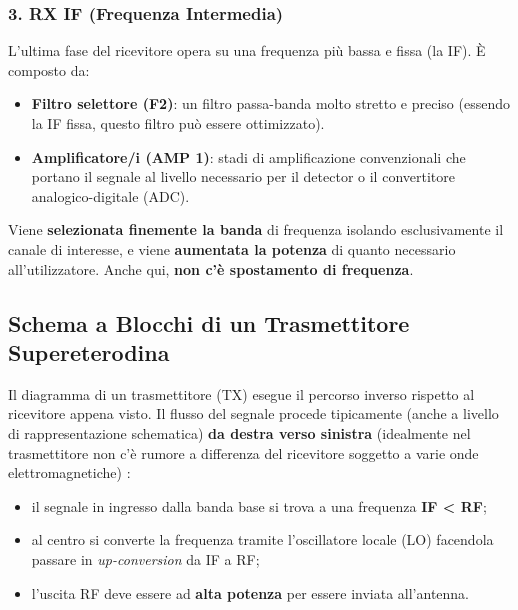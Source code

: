 \documentclass[openany,a4paper,12pt]{book}
\begin{document}
\subsubsection*{3. RX IF (Frequenza Intermedia)}
L'ultima fase del ricevitore opera su una frequenza più bassa e fissa (la IF). È composto da:
\begin{itemize}[label=\textcolor{PoliBlue}{\textbullet}]
    \item \textbf{Filtro selettore (F2)}: un filtro passa-banda molto stretto e preciso (essendo la IF fissa, questo filtro può essere ottimizzato).
    \item \textbf{Amplificatore/i (AMP 1)}: stadi di amplificazione convenzionali che portano il segnale al livello necessario per il detector o il convertitore analogico-digitale (ADC).
\end{itemize}
\begin{nota}[colback=PoliBlue!5, colframe=PoliBlue, title={\textbf{Cosa succede nello stadio IF?}}]
    Viene \textbf{selezionata finemente la banda} di frequenza isolando esclusivamente il canale di interesse, e viene \textbf{aumentata la potenza} di quanto necessario all'utilizzatore. Anche qui, \textbf{non c'è spostamento di frequenza}.
\end{nota}


\subsection{Schema a Blocchi di un Trasmettitore Supereterodina}

Il diagramma di un trasmettitore (TX) esegue il percorso inverso rispetto al ricevitore appena visto. Il flusso del segnale procede tipicamente (anche a livello di rappresentazione schematica) \textbf{da destra verso sinistra} (idealmente nel trasmettitore non c'è rumore a differenza del ricevitore soggetto a varie onde elettromagnetiche)
:
\begin{itemize}[label=\textcolor{PoliBlue}{\textbullet}]
    \item il segnale in ingresso dalla banda base si trova a una frequenza \textbf{IF < RF};
    \item al centro si converte la frequenza tramite l'oscillatore locale (LO) facendola passare in \textit{up-conversion} da IF a RF;
    \item l'uscita RF deve essere ad \textbf{alta potenza} per essere inviata all'antenna.
\end{itemize}
\end{document}

